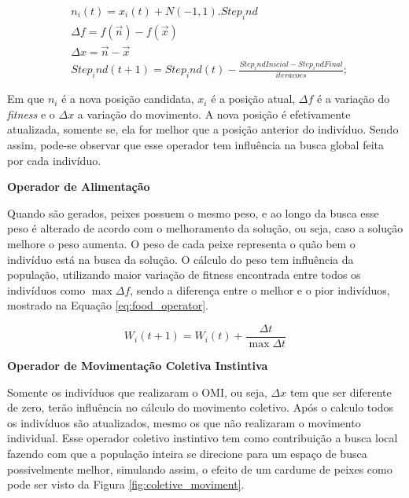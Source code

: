 \begin{equation}
\label{eq:individual_moviment}
\begin{split}
& n_i(t) = x_i(t) + N(-1,1).Step_ind \\
& \Delta f = f(\vec{n}) - f(\vec{x}) \\
& \Delta x = \vec{n} - \vec{x} \\
& Step_ind(t+1) = Step_ind(t) - \frac{Step_indInicial - Step_indFinal}{iteracoes};
\end{split}
\end{equation}

\noindent Em que $n_i$ é a nova posição candidata, $x_i$ é a posição atual, $\Delta f$ é a variação do \textit{fitness} e o $\Delta x$ a variação do movimento. A nova posição é efetivamente atualizada, somente se, ela for melhor que a posição anterior do indivíduo. Sendo assim, pode-se observar que esse operador tem influência na busca global feita por cada indivíduo.

\noindent \textbf{Operador de Alimentação}

Quando são gerados, peixes possuem o mesmo peso, e ao longo da busca esse peso é alterado de acordo com o melhoramento da solução, ou seja, caso a solução melhore o peso aumenta. O peso de cada peixe representa o quão bem o indivíduo está na busca da solução. O cálculo do peso tem influência da população, utilizando maior variação de fitness encontrada entre todos os indivíduos como $\max{\Delta f}$, sendo a diferença entre o melhor e o pior indivíduos, mostrado na Equação \ref{eq:food_operator}.

\begin{equation}
\label{eq:food_operator}
W_i(t+1) = W_i(t) + \frac{\Delta t}{\max{\Delta t}}
\end{equation}

\noindent \textbf{Operador de Movimentação Coletiva Instintiva}

Somente os indivíduos que realizaram o OMI, ou seja, $\Delta x$ tem que ser diferente de zero, terão influência no cálculo do movimento coletivo. Após o calculo todos os indivíduos são atualizados, mesmo os que não realizaram o movimento individual. Esse operador coletivo instintivo tem como contribuição a busca local fazendo com que a população inteira se direcione para um espaço de busca possivelmente melhor, simulando assim, o efeito de um cardume de peixes como pode ser visto da Figura \ref{fig:coletive_moviment}.

